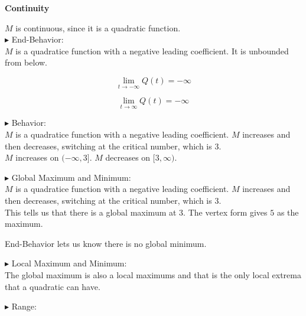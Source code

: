 \documentclass{ximera}
\begin{document}
\begin{example}
\textbf{Continuity}

$M$ is continuous, since it is a quadratic function. \\ 






$\blacktriangleright$ End-Behavior: \\

$M$ is a quadratice function with a negative leading coefficient. It is unbounded from below.


\[
\lim\limits_{t \to -\infty} Q(t) = -\infty
\]


\[
\lim\limits_{t \to \infty} Q(t) = -\infty
\]







$\blacktriangleright$ Behavior: \\


$M$ is a quadratice function with a negative leading coefficient. $M$ increases and then decreases, switching at the critical number, which is $3$. \\



$M$ increases on $(-\infty, 3]$. $M$ decreases on $[3, \infty)$.






$\blacktriangleright$ Global Maximum and Minimum: \\


$M$ is a quadratice function with a negative leading coefficient. $M$ increases and then decreases, switching at the critical number, which is $3$. \\

This tells us that there is a global maximum at $3$.  The vertex form gives $5$ as the maximum.

End-Behavior lets us know there is no global minimum.






$\blacktriangleright$ Local Maximum and Minimum: \\


The global maximum is also a local maximums and that is the only local extrema that a quadratic can have.









$\blacktriangleright$ Range: \\



\end{example}
\end{document}
